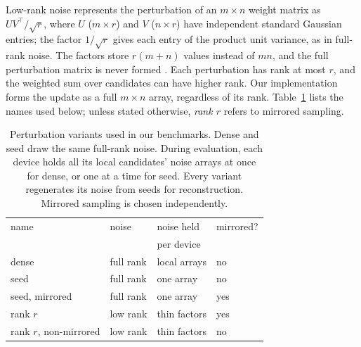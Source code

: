 Low-rank noise represents the perturbation of an $m\times n$ weight matrix as
$UV^\top/\sqrt r$, where $U$ ($m\times r$) and $V$ ($n\times r$) have independent
standard Gaussian entries; the factor $1/\sqrt r$ gives each entry of the product unit
variance, as in full-rank noise. The factors store $r(m+n)$ values instead of $mn$, and
the full perturbation matrix is never formed \citep{eggroll2025}. Each perturbation has
rank at most $r$, and the weighted sum over candidates can have higher rank. Our
implementation forms the update as a full $m\times n$ array, regardless of its rank.
Table~\ref{tab:arms} lists the names used below; unless stated otherwise, \emph{rank $r$}
refers to mirrored sampling.

\begin{table}[t]
\centering
\small
\setlength{\tabcolsep}{3pt}
\caption{Perturbation variants used in our benchmarks. Dense and seed draw the same
  full-rank noise. During evaluation, each device holds all its local candidates' noise
  arrays at once for dense, or one at a time for seed. Every variant regenerates its
  noise from seeds for reconstruction. Mirrored sampling is chosen independently.}
\label{tab:arms}
\begin{tabular}{llll}
\toprule
name & noise & noise held & mirrored? \\
 & & per device & \\
\midrule
dense & full rank & local arrays & no \\
seed & full rank & one array & no \\
seed, mirrored & full rank & one array & yes \\
rank $r$ & low rank & thin factors & yes \\
rank $r$, non-mirrored & low rank & thin factors & no \\
\bottomrule
\end{tabular}
\end{table}

